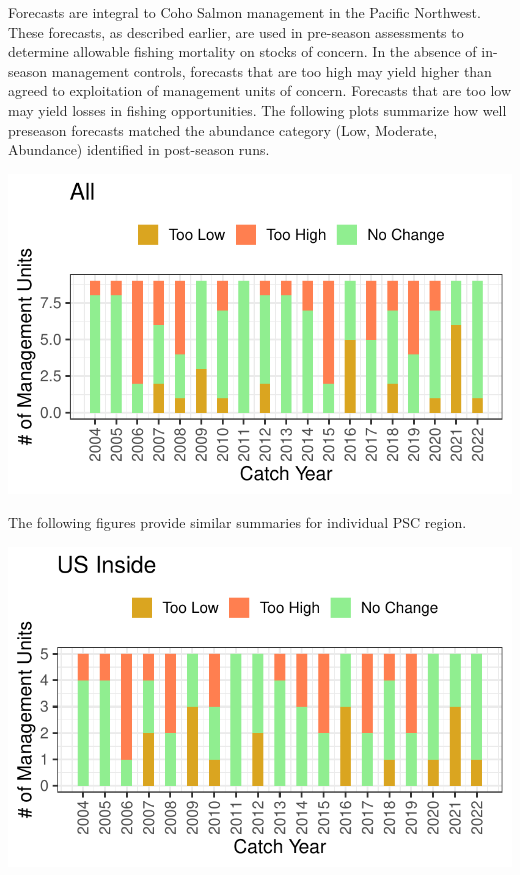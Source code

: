 \documentclass[
  letterpaper,
  DIV=11,
  numbers=noendperiod]{scrartcl}
\begin{document}
Forecasts are integral to Coho Salmon management in the Pacific
Northwest. These forecasts, as described earlier, are used in pre-season
assessments to determine allowable fishing mortality on stocks of
concern. In the absence of in-season management controls, forecasts that
are too high may yield higher than agreed to exploitation of management
units of concern. Forecasts that are too low may yield losses in fishing
opportunities. The following plots summarize how well preseason
forecasts matched the abundance category (Low, Moderate, Abundance)
identified in post-season runs.

\includegraphics{index-5yr_files/figure-pdf/unnamed-chunk-5-1.pdf}

The following figures provide similar summaries for individual PSC
region.

\includegraphics{index-5yr_files/figure-pdf/unnamed-chunk-6-1.pdf}
\end{document}
